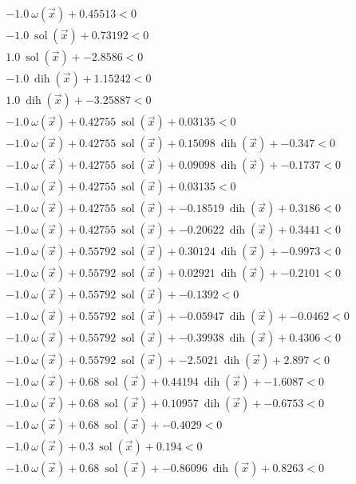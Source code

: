 \documentclass{article} %
\DeclareMathOperator{\sol}{sol}
\DeclareMathOperator{\dih}{dih}
\newcommand{\vx}{\vec{x}}
\begin{document}
\begin{align*} 
&-1.0\ \omega(\vx) + 0.45513 < 0 \tag{D\_195763418} \\
&-1.0\ \sol(\vx) + 0.73192 < 0 \tag{D\_346647038} \\
&1.0\ \sol(\vx) + -2.8586 < 0 \tag{D\_542422328} \\
&-1.0\ \dih(\vx) + 1.15242 < 0 \tag{D\_958501031} \\
&1.0\ \dih(\vx) + -3.25887 < 0 \tag{D\_977882706} \\
&-1.0\ \omega(\vx) + 0.42755\ \sol(\vx) + 0.03135 < 0 \tag{D\_817699709} \\
&-1.0\ \omega(\vx) + 0.42755\ \sol(\vx) + 0.15098\ \dih(\vx) + -0.347 < 0 \tag{D\_221335081} \\
&-1.0\ \omega(\vx) + 0.42755\ \sol(\vx) + 0.09098\ \dih(\vx) + -0.1737 < 0 \tag{D\_380511524} \\
&-1.0\ \omega(\vx) + 0.42755\ \sol(\vx) + 0.03135 < 0 \tag{D\_534704091} \\
&-1.0\ \omega(\vx) + 0.42755\ \sol(\vx) + -0.18519\ \dih(\vx) + 0.3186 < 0 \tag{D\_510654661} \\
&-1.0\ \omega(\vx) + 0.42755\ \sol(\vx) + -0.20622\ \dih(\vx) + 0.3441 < 0 \tag{D\_296038926} \\
&-1.0\ \omega(\vx) + 0.55792\ \sol(\vx) + 0.30124\ \dih(\vx) + -0.9973 < 0 \tag{D\_725284239} \\
&-1.0\ \omega(\vx) + 0.55792\ \sol(\vx) + 0.02921\ \dih(\vx) + -0.2101 < 0 \tag{D\_508592316} \\
&-1.0\ \omega(\vx) + 0.55792\ \sol(\vx) + -0.1392 < 0 \tag{D\_780228595} \\
&-1.0\ \omega(\vx) + 0.55792\ \sol(\vx) + -0.05947\ \dih(\vx) + -0.0462 < 0 \tag{D\_129176394} \\
&-1.0\ \omega(\vx) + 0.55792\ \sol(\vx) + -0.39938\ \dih(\vx) + 0.4306 < 0 \tag{D\_794503453} \\
&-1.0\ \omega(\vx) + 0.55792\ \sol(\vx) + -2.5021\ \dih(\vx) + 2.897 < 0 \tag{D\_820371697} \\
&-1.0\ \omega(\vx) + 0.68\ \sol(\vx) + 0.44194\ \dih(\vx) + -1.6087 < 0 \tag{D\_993947481} \\
&-1.0\ \omega(\vx) + 0.68\ \sol(\vx) + 0.10957\ \dih(\vx) + -0.6753 < 0 \tag{D\_888634003} \\
&-1.0\ \omega(\vx) + 0.68\ \sol(\vx) + -0.4029 < 0 \tag{D\_985594975} \\
&-1.0\ \omega(\vx) + 0.3\ \sol(\vx) + 0.194 < 0 \tag{D\_420356876} \\
&-1.0\ \omega(\vx) + 0.68\ \sol(\vx) + -0.86096\ \dih(\vx) + 0.8263 < 0 \tag{D\_278856582} \\

\end{align*}
\end{document}
